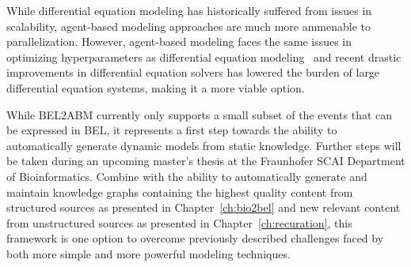 While differential equation modeling has historically suffered from issues in scalability, agent-based modeling approaches are much more ammenable to parallelization.
However, agent-based modeling faces the same issues in optimizing hyperparameters as differential equation modeling~\cite{Stapor2018} and recent drastic improvements in differential equation solvers has lowered the burden of large differential equation systems, making it a more viable option.

While BEL2ABM currently only supports a small subset of the events that can be expressed in \ac{BEL}, it represents a first step towards the ability to automatically generate dynamic models from static knowledge.
Further steps will be taken during an upcoming master's thesis at the Fraunhofer SCAI Department of Bioinformatics.
Combine with the ability to automatically generate and maintain knowledge graphs containing the highest quality content from structured sources as presented in Chapter~\ref{ch:bio2bel} and new relevant content from unstructured sources as presented in Chapter~\ref{ch:recuration}, this framework is one option to overcome previously described challenges faced by both more simple and more powerful modeling techniques.
